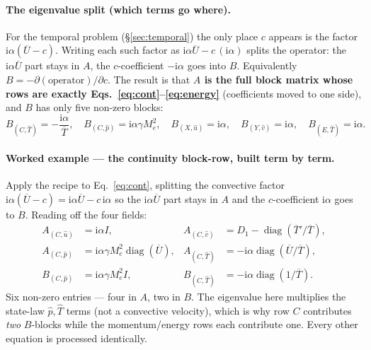 \documentclass[11pt]{article}
\newcommand{\imag}{\mathrm{i}}
\newcommand{\Mae}{M_e}
\renewcommand{\bar}[1]{\overline{#1}}
\newcommand{\hatu}{\hat{u}}
\newcommand{\hatv}{\hat{v}}
\newcommand{\hatT}{\hat{T}}
\newcommand{\hatp}{\hat{p}}
\begin{document}
\paragraph{The eigenvalue split (which terms go where).} For the temporal problem (\S\ref{sec:temporal})
the only place $c$ appears is the factor $\imag\alpha(\bar U-c)$. Writing each such factor as
$\imag\alpha\bar U-c\,(\imag\alpha)$ splits the operator: the $\imag\alpha\bar U$ part stays in $A$, the
$c$-coefficient $-\imag\alpha$ goes into $B$. Equivalently $B=-\partial(\text{operator})/\partial c$. The
result is that \textbf{$A$ is the full block matrix whose rows are exactly Eqs.~\eqref{eq:cont}--\eqref{eq:energy}}
(coefficients moved to one side), and $B$ has only five non-zero blocks:
\begin{equation}\label{eq:Bblocks}
  B_{(C,\hatT)}=-\frac{\imag\alpha}{\bar T},\quad
  B_{(C,\hatp)}=\imag\alpha\gamma\Mae^2,\quad
  B_{(X,\hatu)}=\imag\alpha,\quad
  B_{(Y,\hatv)}=\imag\alpha,\quad
  B_{(E,\hatT)}=\imag\alpha .
\end{equation}
\paragraph{Worked example --- the continuity block-row, built term by term.} Apply the recipe to
Eq.~\eqref{eq:cont}, splitting the convective factor $\imag\alpha(\bar U-c)=\imag\alpha\bar U-c\,\imag\alpha$
so the $\imag\alpha\bar U$ part stays in $A$ and the $c$-coefficient $\imag\alpha$ goes to $B$. Reading off
the four fields:
\begin{align*}
A_{(C,\hatu)}&=\imag\alpha I, & A_{(C,\hatv)}&=D_1-\operatorname{diag}(\bar T'/\bar T),\\
A_{(C,\hatp)}&=\imag\alpha\gamma\Mae^2\operatorname{diag}(\bar U), & A_{(C,\hatT)}&=-\imag\alpha\operatorname{diag}(\bar U/\bar T),\\
B_{(C,\hatp)}&=\imag\alpha\gamma\Mae^2 I, & B_{(C,\hatT)}&=-\imag\alpha\operatorname{diag}(1/\bar T).
\end{align*}
Six non-zero entries --- four in $A$, two in $B$. The eigenvalue here multiplies the state-law $\hatp,\hatT$
terms (not a convective velocity), which is why row $C$ contributes \emph{two} $B$-blocks while the
momentum/energy rows each contribute one. Every other equation is processed identically.
\end{document}

